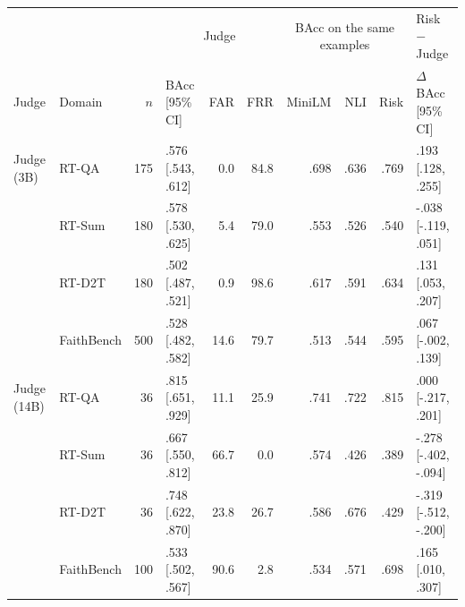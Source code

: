 \begin{tabular}{llrlrrrrrl}
\toprule
 & & & \multicolumn{3}{c}{Judge} & \multicolumn{3}{c}{BAcc on the same examples} & Risk $-$ Judge \\
Judge & Domain & $n$ & BAcc [95\% CI] & FAR & FRR & MiniLM & NLI & Risk & $\Delta$BAcc [95\% CI] \\
\midrule
Judge (3B) & RT-QA & 175 & .576 [.543, .612] & 0.0 & 84.8 & .698 & .636 & .769 & .193 [.128, .255] \\
 & RT-Sum & 180 & .578 [.530, .625] & 5.4 & 79.0 & .553 & .526 & .540 & -.038 [-.119, .051] \\
 & RT-D2T & 180 & .502 [.487, .521] & 0.9 & 98.6 & .617 & .591 & .634 & .131 [.053, .207] \\
 & FaithBench & 500 & .528 [.482, .582] & 14.6 & 79.7 & .513 & .544 & .595 & .067 [-.002, .139] \\
\midrule
Judge (14B) & RT-QA & 36 & .815 [.651, .929] & 11.1 & 25.9 & .741 & .722 & .815 & .000 [-.217, .201] \\
 & RT-Sum & 36 & .667 [.550, .812] & 66.7 & 0.0 & .574 & .426 & .389 & -.278 [-.402, -.094] \\
 & RT-D2T & 36 & .748 [.622, .870] & 23.8 & 26.7 & .586 & .676 & .429 & -.319 [-.512, -.200] \\
 & FaithBench & 100 & .533 [.502, .567] & 90.6 & 2.8 & .534 & .571 & .698 & .165 [.010, .307] \\
\bottomrule
\end{tabular}
